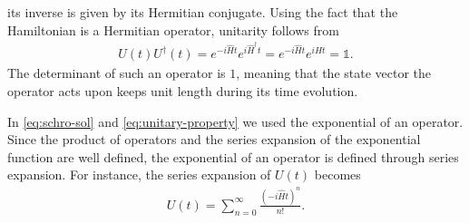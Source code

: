 its inverse is given by its Hermitian conjugate. Using the fact that the Hamiltonian is a Hermitian operator, unitarity follows from 
\begin{align}\label{eq:unitary-property}
    U(t)U^\dagger(t) = e^{-i\hat{H}t}e^{i\hat{H}^\dagger t} = e^{-i\hat{H}t}e^{i\hat{H}t} = \mathds{1}.
\end{align}
The determinant of such an operator is $1$, meaning that
the state vector the operator acts upon keeps unit length during its time evolution.
\par
In \cref{eq:schro-sol} and \cref{eq:unitary-property} we used the exponential of an operator. Since the
product of operators and
the series expansion of the exponential function are well defined, the exponential of an operator is defined through series expansion.
For instance, the series expansion of $U(t)$ becomes
\begin{align}\label{eq:matrix-exp}
    U(t) = \sum\limits_{n=0}^\infty \frac{(-i\hat{H}t)^n}{n!}.
\end{align}

